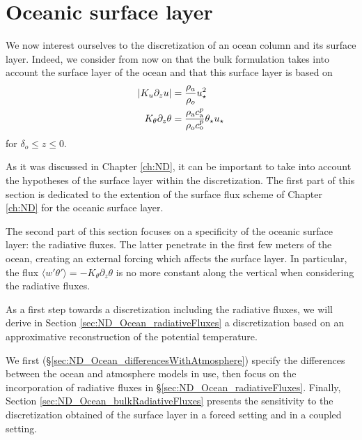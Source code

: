 \section{Oceanic surface layer}
\label{sec:OceanND_OSL}
We now interest ourselves to the discretization of an ocean
column and its surface layer.
Indeed, we consider from now on that the bulk formulation
takes into account the surface layer of the ocean and that
this surface layer is based on
\begin{equation}
	\begin{aligned}
	|K_u \partial_z u| &= {\frac{\rho_a}{\rho_o}}
	u_\star^2\\
	K_\theta \partial_z \theta &=
	{\frac{\rho_{\rm a} c_{\rm a}^p}
			{\rho_{\rm o} c_{\rm o}^p}}
	\theta_\star u_\star
	\end{aligned}
\end{equation}
for $\delta_o \leq z \leq 0$.
\par
As it was discussed in Chapter \ref{ch:ND}, it can be important
to take into account the hypotheses of the surface layer within
the discretization. The first part of this section is dedicated
to the extention of the surface flux scheme of Chapter \ref{ch:ND}
for the oceanic surface layer.
\par
The second part of this section focuses on a specificity of the
oceanic surface layer: the radiative fluxes. The latter penetrate
in the first few meters of the ocean, creating an external forcing
which affects the surface layer. In particular, the flux
$\langle w' \theta'\rangle = -K_\theta \partial_z \theta$ is no more
constant along the vertical when considering the radiative fluxes.
\par
As a first step towards a discretization including the radiative
fluxes, we will derive in Section \ref{sec:ND_Ocean_radiativeFluxes}
a discretization based on an approximative reconstruction of the
potential temperature.
\par
% 
We first (\S \ref{sec:ND_Ocean_differencesWithAtmosphere})
specify the differences between the ocean and
atmosphere models in use,
then focus on the incorporation of radiative fluxes in
\S \ref{sec:ND_Ocean_radiativeFluxes}.
Finally, Section \ref{sec:ND_Ocean_bulkRadiativeFluxes}
presents the sensitivity to the discretization obtained of the
surface layer in a forced setting and in a coupled setting.
